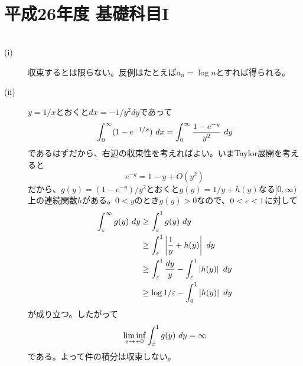 \section{平成26年度 基礎科目I}

\subsubsection{}
\begin{sol} ${}$
  \begin{description}
    \item[(i)] 収束するとは限らない。反例はたとえば$a_n = \log n$とすれば得られる。
    \item[(ii)] $y=1/x$とおくと$dx = - 1/y^2 dy$であって
    \[
    \int_0^{\infty} (1 - e^{-1/x}) \ dx = \int_0^{\infty} \frac{1 -e^{-y} }{ y^2} \ dy
    \]
    であるはずだから、右辺の収束性を考えればよい。いまTaylor展開を考えると
    \[
    e^{-y} = 1 -y + O(y^2)
    \]
    だから、$g(y) = (1 - e^{-y})/ y^2 $とおくと$g(y) = 1/y + h(y)$なる$[0,\infty)$上の連続関数$h$がある。$0 < y$のとき$g(y) > 0$なので、$0 < {\varepsilon} < 1$に対して
    \begin{align*}
      \int_{\ve}^{\infty} g(y) \ dy &\geq \int_{\ve}^{1} g(y) \ dy \\
      &\geq \int_{\ve}^{1} \abs{ \f{1}{y} + h(y) } \ dy \\
      &\geq \int_{\ve}^{1} \f{dy}{y} - \int_{\ve}^{1} \abs{ h(y) } \ dy \\
      &\geq \log 1/\ve - \int_{0}^{1} \abs{ h(y) } \ dy
    \end{align*}
    が成り立つ。したがって
    \[
    \liminf_{{\varepsilon} \to +0} \int_{{\varepsilon}}^{1} g(y) \ dy = \infty
    \]
    である。よって件の積分は収束しない。
  \end{description}
\end{sol}

\newpage


